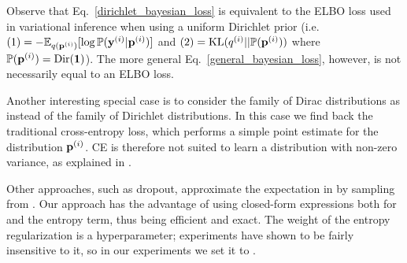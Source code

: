 Observe that Eq.~\eqref{dirichlet_bayesian_loss} is equivalent to the ELBO loss used in variational inference when using a uniform Dirichlet prior (i.e. $(1)=-\mathbb{E}_{q(\mathbf{p}^{(i)})}[\log \mathbb{P}(\mathbf{y}^{(i)}|\mathbf{p}^{(i)})]$ and $(2)=\text{KL}(q^{(i)}||\mathbb{P}(\mathbf{p}^{(i)}))$ where $\mathbb{P}(\mathbf{p}^{(i)}) = \text{Dir}(\mathbf{1})$). The more general Eq.~\eqref{general_bayesian_loss}, however, is not necessarily equal to an ELBO loss.

Another interesting special case is to consider the family of Dirac distributions as  instead of the family of Dirichlet distributions. In this case we find back the traditional cross-entropy loss, which performs a simple point estimate for the distribution $\mathbf{p}^{(i)}$. CE is therefore not suited to learn a distribution with non-zero variance, as explained in \cite{uceloss}.

Other approaches, such as dropout, approximate the expectation in \UCEacro by sampling from . Our approach has the advantage of using closed-form expressions both for \UCEacro \cite{uceloss} and the entropy term, thus being efficient and exact. The weight of the entropy regularization is a hyperparameter; experiments have shown \PostNetacro to be fairly insensitive to it, so in our experiments we set it to .
